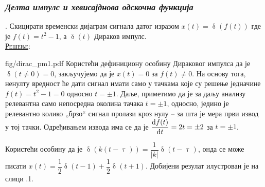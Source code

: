 \subsubsection{\textit{Делта импулс и хевисајднова одскочна функција}}
\noindent
\textbf{\ID}. 
Скицирати временски дијаграм сигнала датог изразом $x(t) = \updelta(f(t))$ где је 
$f(t) = t^2 - 1$, а
$\updelta(t)$ Дираков импулс. \\[2mm]

\textsc{\underline{Решење}}: 

\begin{slikaDesno}
[1]
[$t^2 - 1$ (- - -), $\updelta(t^2 - 1)$ (---)]
{fig/dirac_pm1.pdf}
Користећи дефинициону особину Дираковог импулса да је $\updelta(t \neq 0) = 0$, 
закључујемо да је $x(t) = 0$ за $f(t) \neq 0$. На основу тога, ненулту вредност ће дати сигнал имати 
само у тачкама које су решење једначине $f(t) = t^2 - 1 = 0$ односно $t = \pm 1$.  
Даље, приметимо да је за даљу анализу релевантна само непосредна околина 
тачака $t = \pm 1$, односно, једино је релевантно колико „брзо“ сигнал пролази
кроз нулу -- за шта је мера први извод у тој тачки. Одређивањем извода  има се да је 
$\dfrac{{\rm d} f(t)}{{\rm d} t} = 2t = \pm 2$ за $t = \pm 1$. 
\end{slikaDesno}
Користећи особину да је $\updelta( k(t - \uptau) ) = \dfrac{1}{|k|} \updelta(t - \uptau)$, онда 
се може писати 
${x(t) = \dfrac12 \updelta(t - 1) + \dfrac12 \updelta(t + 1)}$. Добијени резулат илустрован је на слици 
\ID.1. 